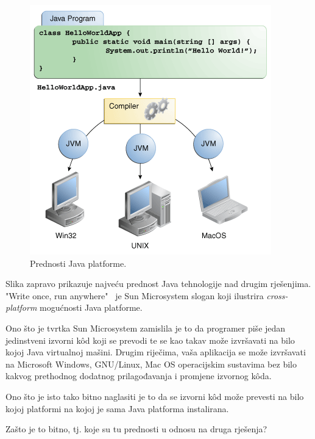 \begin{figure}[h!]
    \label{fig:java-platform-benefits}
    \caption{Prednosti Java platforme.}
    \centering
    \includegraphics[scale=0.6]{images/java-platform-benefits.png}
\end{figure}

Slika zapravo prikazuje najveću prednost Java tehnologije nad drugim rješenjima. "Write once, run anywhere"~\cite{writeoncerunanywhere} je Sun Microsystem slogan koji ilustrira \emph{cross-platform} mogućnosti Java platforme.

Ono što je tvrtka Sun Microsystem zamislila je to da programer piše jedan jedinstveni izvorni kôd koji se prevodi te se kao takav može izvršavati na bilo kojoj Java virtualnoj mašini. Drugim riječima, vaša aplikacija se može izvršavati na Microsoft Windows, GNU/Linux, Mac OS operacijskim sustavima bez bilo kakvog prethodnog dodatnog prilagođavanja i promjene izvornog kôda.

Ono što je isto tako bitno naglasiti je to da se izvorni kôd može prevesti na bilo kojoj platformi na kojoj je sama Java platforma instalirana.

Zašto je to bitno, tj. koje su tu prednosti u odnosu na druga rješenja?


